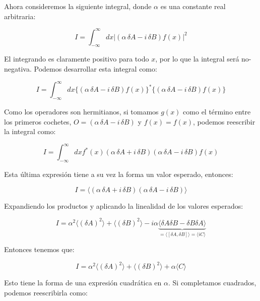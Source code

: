 Ahora consideremos la siguiente integral, donde $\alpha$ es una constante real arbitraria:

\begin{equation}
    I= \int_{-\infty}^{\infty}dx |(\alpha \, \delta A - i \,\delta B)f(x)|^2
\end{equation}

El integrando es claramente positivo para todo $x$, por lo que la integral será no-negativa. Podemos desarrollar esta integral como:

\begin{equation}
    I= \int_{-\infty}^{\infty}dx \{(\alpha \, \delta A - i \,\delta B)f(x)\}^*\{(\alpha \, \delta A - i \,\delta B)f(x)\}
\end{equation}

Como los operadores son hermitianos, si tomamos $g(x)$ como el término entre los primeros cochetes, $O=(\alpha \, \delta A - i \,\delta B)$ y $f(x)=f(x)$, podemos reescribir la integral como:

\begin{equation}
    I=\int_{-\infty}^{\infty}dx f^*(x)(\alpha \, \delta A + i \,\delta B)(\alpha \, \delta A - i \,\delta B)f(x)
\end{equation}

Esta última expresión tiene a su vez la forma un valor esperado, entonces:

\begin{equation}
    I=\langle (\alpha\,\delta A + i\,\delta B)(\alpha\,\delta A - i\,\delta B)\rangle
\end{equation}

Expandiendo los productos y aplicando la linealidad de los valores esperados:

\begin{equation}
    I=\alpha^2\langle(\delta A)^2\rangle + \langle(\delta B)^2\rangle- i\alpha \underbrace{\langle \delta A\delta B - \delta B \delta A \rangle}_{=\langle\left[\delta A, \delta B\right]\rangle=\langle i C\rangle}
\end{equation}

Entonces tenemos que:

\begin{equation}
    I= \alpha^2\langle(\delta A)^2\rangle + \langle(\delta B)^2\rangle +\alpha \langle C \rangle
\end{equation}

Esto tiene la forma de una expresión cuadrática en $\alpha$. Si completamos cuadrados, podemos reescribirla como:

